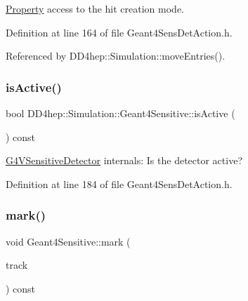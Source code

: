 \hyperlink{class_d_d4hep_1_1_property}{Property} access to the hit creation mode. 



Definition at line 164 of file Geant4\+Sens\+Det\+Action.\+h.



Referenced by D\+D4hep\+::\+Simulation\+::move\+Entries().

\hypertarget{class_d_d4hep_1_1_simulation_1_1_geant4_sensitive_a0f316f5254a2c3e724b73ddabd1e39fc}{}\label{class_d_d4hep_1_1_simulation_1_1_geant4_sensitive_a0f316f5254a2c3e724b73ddabd1e39fc} 
\subsubsection{\texorpdfstring{is\+Active()}{isActive()}}
{\footnotesize\ttfamily bool D\+D4hep\+::\+Simulation\+::\+Geant4\+Sensitive\+::is\+Active (\begin{DoxyParamCaption}{ }\end{DoxyParamCaption}) const\hspace{0.3cm}{\ttfamily [inline]}}



\hyperlink{class_g4_v_sensitive_detector}{G4\+V\+Sensitive\+Detector} internals\+: Is the detector active? 



Definition at line 184 of file Geant4\+Sens\+Det\+Action.\+h.

\hypertarget{class_d_d4hep_1_1_simulation_1_1_geant4_sensitive_a5dd1e49bfcc1937ad6dc302f969ee544}{}\label{class_d_d4hep_1_1_simulation_1_1_geant4_sensitive_a5dd1e49bfcc1937ad6dc302f969ee544} 
\subsubsection{\texorpdfstring{mark()}{mark()}\hspace{0.1cm}{\footnotesize\ttfamily [1/2]}}
{\footnotesize\ttfamily void Geant4\+Sensitive\+::mark (\begin{DoxyParamCaption}\item[{const G4\+Track $\ast$}]{track }\end{DoxyParamCaption}) const}




